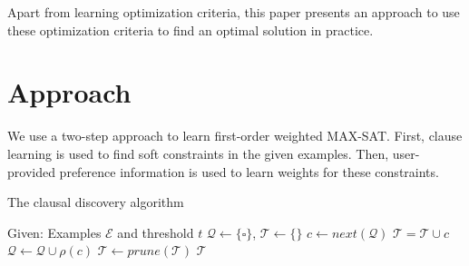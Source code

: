 \documentclass[letterpaper]{article}
\newcommand{\sym}[1]{\ensuremath{\mathcal{#1}}}
\theoremstyle{definition}
\newtheorem{example}{Example}
\begin{document}
Apart from learning optimization criteria, this paper presents an approach to use these optimization criteria to find an optimal solution in practice.


\section{Approach}
We use a two-step approach to learn first-order weighted MAX-SAT.
First, clause learning is used to find soft constraints in the given examples.
Then, user-provided preference information is used to learn weights for these constraints.


\begin{algorithm}
  \caption{The clausal discovery algorithm}
  \label{alg:cd}

  \begin{algorithmic}
  \State Given: Examples \sym{E} and threshold $t$
  \State $\sym{Q} \gets \{\square\}$, $\sym{T} \gets \{\}$
  \While{$\#\sym{Q} > 0$}
    \State $c \gets next(\sym{Q})$
    \If{$\#\{e \in \sym{E} | e \models c\} \geq t$}
      \If{$\sym{T} \not\models c$}
        \State $\sym{T} = \sym{T} \cup c$
      \EndIf
    \Else
      \State $\sym{Q} \gets \sym{Q} \cup \rho(c)$
    \EndIf
  \EndWhile
  \State $\sym{T} \gets prune(\sym{T})$
  \State \Return \sym{T}
  \end{algorithmic}
\end{algorithm}
\end{document}
